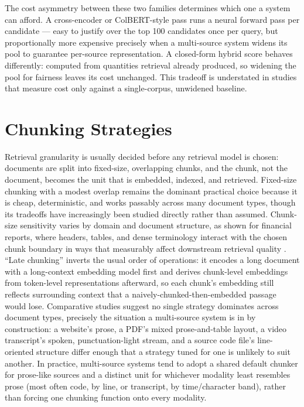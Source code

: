 \documentclass[conference]{IEEEtran}
\begin{document}
The cost asymmetry between these two families determines which one a system can afford. A cross-encoder or ColBERT-style pass \cite{nogueira2019bert,khattab2020colbert} runs a neural forward pass per candidate — easy to justify over the top 100 candidates once per query, but proportionally more expensive precisely when a multi-source system widens its pool to guarantee per-source representation. A closed-form hybrid score behaves differently: computed from quantities retrieval already produced, so widening the pool for fairness leaves its cost unchanged. This tradeoff is understated in studies that measure cost only against a single-corpus, unwidened baseline.

\section{Chunking Strategies}
\label{sec:chunking}

Retrieval granularity is usually decided before any retrieval model is chosen: documents are split into fixed-size, overlapping chunks, and the chunk, not the document, becomes the unit that is embedded, indexed, and retrieved. Fixed-size chunking with a modest overlap remains the dominant practical choice because it is cheap, deterministic, and works passably across many document types, though its tradeoffs have increasingly been studied directly rather than assumed. Chunk-size sensitivity varies by domain and document structure, as shown for financial reports, where headers, tables, and dense terminology interact with the chosen chunk boundary in ways that measurably affect downstream retrieval quality \cite{jimenoyepes2024chunking}. ``Late chunking'' \cite{gunther2024latechunking} inverts the usual order of operations: it encodes a long document with a long-context embedding model first and derives chunk-level embeddings from token-level representations afterward, so each chunk's embedding still reflects surrounding context that a naively-chunked-then-embedded passage would lose. Comparative studies \cite{merola2025chunking} suggest no single strategy dominates across document types, precisely the situation a multi-source system is in by construction: a website's prose, a PDF's mixed prose-and-table layout, a video transcript's spoken, punctuation-light stream, and a source code file's line-oriented structure differ enough that a strategy tuned for one is unlikely to suit another. In practice, multi-source systems tend to adopt a shared default chunker for prose-like sources and a distinct unit for whichever modality least resembles prose (most often code, by line, or transcript, by time/character band), rather than forcing one chunking function onto every modality.
\end{document}

